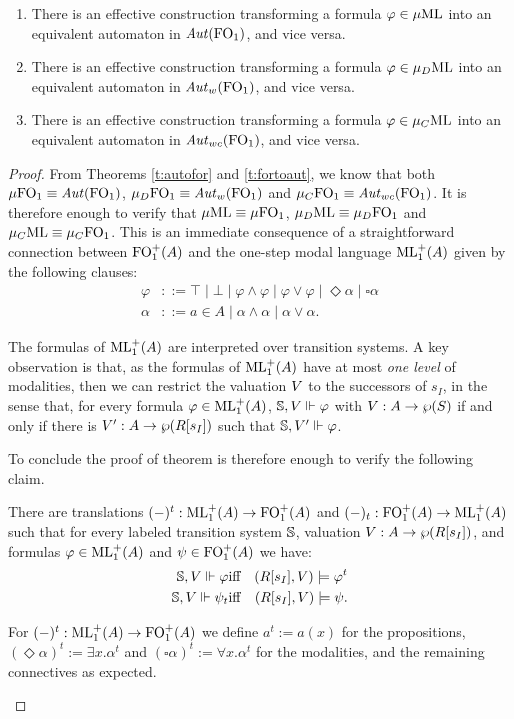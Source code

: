 \begin{theorem}
\label{t:mlaut}
\begin{enumerate}
\item 
There is an effective construction transforming a formula $\varphi \in \mu\mathrm{ML}$ into
an equivalent automaton in $\mathit{Aut}(\mathrm{FO}_1)$, and vice versa.
\item 
There is an effective construction transforming a formula $\varphi \in \mu_{D}\mathrm{ML}$ into
an equivalent automaton in $\mathit{Aut}_{w}(\mathrm{FO}_1)$, and vice versa.
\item 
There is an effective construction transforming a formula $\varphi \in \mu_{C}\mathrm{ML}$ into
an equivalent automaton in $\mathit{Aut}_{wc}(\mathrm{FO}_1)$, and vice versa.
\end{enumerate}
\end{theorem}
\begin{proof}
From Theorems \ref{t:autofor} and \ref{t:fortoaut}, we know that both $\mu\mathrm{FO}_1 \equiv \mathit{Aut}(\mathrm{FO}_1)$, $\mu_{D}\mathrm{FO}_1 \equiv \mathit{Aut}_{w}(\mathrm{FO}_1)$ and  $\mu_{C}\mathrm{FO}_1 \equiv  \mathit{Aut}_{wc}(\mathrm{FO}_1)$. It is therefore enough to verify that $\mu\mathrm{ML} \equiv \mu\mathrm{FO}_1$, $\mu_{D}\mathrm{ML} \equiv \mu_{D}\mathrm{FO}_1$ and  $\mu_{C}\mathrm{ML} \equiv \mu_{C}\mathrm{FO}_1$. This is an immediate consequence of a straightforward connection between $\mathrm{FO}_1^+(A)$ and the one-step modal language $\mathrm{ML}_1^+(A)$ given by the following clauses:
\begin{align*}
	\varphi &::= \top \mid \bot \mid \varphi\land\varphi \mid \varphi\lor\varphi \mid \Diamond\alpha \mid \square \alpha \\
	\alpha &::= a \in A \mid \alpha\land\alpha \mid \alpha\lor\alpha.
\end{align*}

The formulas of $\mathrm{ML}_1^+(A)$ are interpreted over transition systems. A key observation is that, as the formulas of $\mathrm{ML}_1^+(A)$ have at most \emph{one level} of modalities, then we can restrict the valuation $V$ to the successors of $s_I$, in the sense that, for every formula $\varphi\in\mathrm{ML}_1^+(A)$, $\mathbb{S},V \Vdash \varphi$ with $V:A\to\wp(S)$ if and only if there is $V':A\to\wp(R[s_I])$ such that $\mathbb{S},V' \Vdash \varphi$.
 
To conclude the proof of theorem is therefore enough to verify the following claim.
\begin{claim}\label{claim:oml2ofo}
	There are translations $(-)^t:\mathrm{ML}_1^+(A) \to \mathrm{FO}_1^+(A)$ and
	$(-)_t:\mathrm{FO}_1^+(A) \to \mathrm{ML}_1^+(A)$ such that for every labeled transition system $\mathbb{S}$,
	valuation $V:A \to \wp(R[s_I])$, and formulas $\varphi\in\mathrm{ML}_1^+(A)$ and $\psi \in \mathrm{FO}_1^+(A)$ we have:
	\begin{eqnarray}
		\model,\val \mmodels \varphi &\text{iff}& (R[s_I],\val) \models \varphi^t\label{eq:oml2ofo:1} \\
		\model,\val \mmodels \psi_t &\text{iff}& (R[s_I],\val) \models \psi.\label{eq:oml2ofo:2}
	\end{eqnarray}
\end{claim}
\begin{pfclaim}
	For $(-)^t:\mathrm{ML}_1^+(A) \to \mathrm{FO}_1^+(A)$ we define $a^t := a(x)$ for the propositions, $(\Diamond\alpha)^t := \exists x.\alpha^t$ and $(\square\alpha)^t := \forall x.\alpha^t$ 
	for the modalities, and the remaining connectives as expected.


\end{pfclaim}
\end{proof}
